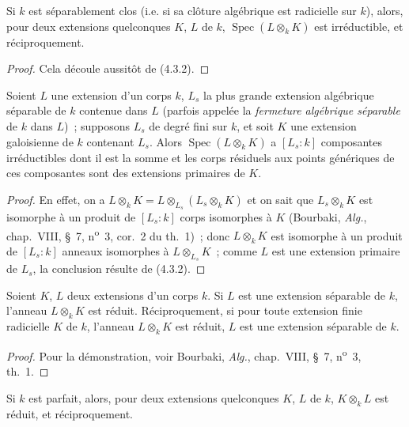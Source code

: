 \begin{corollary}[4.3.3]
\label{IV.2.4.3.3-fr}
Si $k$ est séparablement clos (i.e. si sa clôture algébrique est radicielle sur
$k$), alors, pour deux extensions quelconques $K$, $L$ de $k$,
$\operatorname{Spec}(L\otimes_k K)$ est irréductible, et réciproquement.
\end{corollary}

\begin{proof}
Cela découle aussitôt de (4.3.2).
\end{proof}

\begin{corollary}[4.3.4]
\label{IV.2.4.3.4-fr}
Soient $L$ une extension d'un corps $k$, $L_s$ la plus grande extension
algébrique séparable de $k$ contenue dans $L$ (parfois appelée la
\emph{fermeture algébrique séparable} de $k$ dans $L$)~; supposons $L_s$ de
degré fini sur $k$, et soit $K$ une extension galoisienne de $k$ contenant
$L_s$. Alors $\operatorname{Spec}(L\otimes_k K)$ a $[L_s:k]$ composantes
irréductibles dont il est la somme et les corps résiduels aux points génériques
de ces composantes sont des extensions primaires de $K$.
\end{corollary}

\begin{proof}
En effet, on a $L\otimes_k K=L\otimes_{L_s}(L_s\otimes_k K)$ et on sait que
$L_s\otimes_k K$ est isomorphe à un produit de $[L_s:k]$ corps isomorphes à
$K$ (Bourbaki, \emph{Alg.}, chap.~VIII, \S~7, n\textsuperscript{o}~3,
cor.~2 du th.~1)~; donc $L\otimes_k K$ est isomorphe à un produit de
$[L_s:k]$ anneaux isomorphes à $L\otimes_{L_s}K$~; comme $L$ est une
extension primaire de $L_s$, la conclusion résulte de (4.3.2).
\end{proof}

\begin{proposition}[4.3.5]
\label{IV.2.4.3.5-fr}
Soient $K$, $L$ deux extensions d'un corps $k$. Si $L$ est une extension
séparable de $k$, l'anneau $L\otimes_k K$ est réduit. Réciproquement, si pour
toute extension finie radicielle $K$ de $k$, l'anneau $L\otimes_k K$ est
réduit, $L$ est une extension séparable de $k$.
\end{proposition}

\begin{proof}
Pour la démonstration, voir Bourbaki, \emph{Alg.}, chap.~VIII, \S~7,
n\textsuperscript{o}~3, th.~1.
\end{proof}

\begin{corollary}[4.3.6]
\label{IV.2.4.3.6-fr}
Si $k$ est parfait, alors, pour deux extensions quelconques $K$, $L$ de $k$,
$K\otimes_k L$ est réduit, et réciproquement.
\end{corollary}

